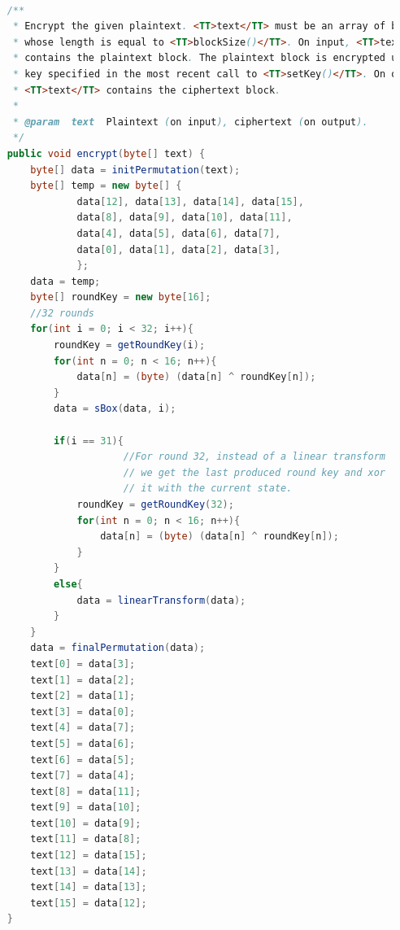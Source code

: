 \documentclass[12pt]{article} %
\begin{document}
\begin{lstlisting}[language=Java, basicstyle=\small, breaklines=true]
    
    /**
     * Encrypt the given plaintext. <TT>text</TT> must be an array of bytes
     * whose length is equal to <TT>blockSize()</TT>. On input, <TT>text</TT>
     * contains the plaintext block. The plaintext block is encrypted using the
     * key specified in the most recent call to <TT>setKey()</TT>. On output,
     * <TT>text</TT> contains the ciphertext block.
     *
     * @param  text  Plaintext (on input), ciphertext (on output).
     */
    public void encrypt(byte[] text) {
        byte[] data = initPermutation(text);
        byte[] temp = new byte[] {
                data[12], data[13], data[14], data[15],
                data[8], data[9], data[10], data[11],
                data[4], data[5], data[6], data[7],
                data[0], data[1], data[2], data[3],
                };
        data = temp;
        byte[] roundKey = new byte[16];
        //32 rounds
        for(int i = 0; i < 32; i++){
            roundKey = getRoundKey(i);
            for(int n = 0; n < 16; n++){
                data[n] = (byte) (data[n] ^ roundKey[n]);
            }
            data = sBox(data, i);
            
            if(i == 31){
				        //For round 32, instead of a linear transform
				        // we get the last produced round key and xor 
				        // it with the current state.
                roundKey = getRoundKey(32);
                for(int n = 0; n < 16; n++){
                    data[n] = (byte) (data[n] ^ roundKey[n]);
                } 
            }
            else{
                data = linearTransform(data);
            }
        }
        data = finalPermutation(data);   
        text[0] = data[3];
        text[1] = data[2];
        text[2] = data[1];
        text[3] = data[0];
        text[4] = data[7];
        text[5] = data[6];
        text[6] = data[5];
        text[7] = data[4];
        text[8] = data[11];
        text[9] = data[10];
        text[10] = data[9];
        text[11] = data[8];
        text[12] = data[15];
        text[13] = data[14];
        text[14] = data[13];
        text[15] = data[12];
    }


\end{lstlisting}
\end{document}

